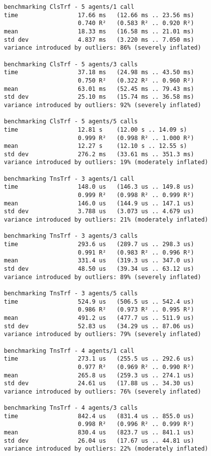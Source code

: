 \begin{verbatim}
benchmarking ClsTrf - 5 agents/1 call
time                 17.66 ms   (12.66 ms .. 23.56 ms)
                     0.740 R²   (0.583 R² .. 0.920 R²)
mean                 18.33 ms   (16.58 ms .. 21.01 ms)
std dev              4.837 ms   (3.220 ms .. 7.050 ms)
variance introduced by outliers: 86% (severely inflated)

benchmarking ClsTrf - 5 agents/3 calls
time                 37.18 ms   (24.98 ms .. 43.50 ms)
                     0.750 R²   (0.322 R² .. 0.960 R²)
mean                 63.01 ms   (52.45 ms .. 79.43 ms)
std dev              25.10 ms   (15.74 ms .. 36.58 ms)
variance introduced by outliers: 92% (severely inflated)

benchmarking ClsTrf - 5 agents/5 calls
time                 12.81 s    (12.00 s .. 14.09 s)
                     0.999 R²   (0.998 R² .. 1.000 R²)
mean                 12.27 s    (12.10 s .. 12.55 s)
std dev              276.2 ms   (33.61 ms .. 351.3 ms)
variance introduced by outliers: 19% (moderately inflated)

benchmarking TnsTrf - 3 agents/1 call
time                 148.0 us   (146.3 us .. 149.8 us)
                     0.999 R²   (0.998 R² .. 0.999 R²)
mean                 146.0 us   (144.9 us .. 147.1 us)
std dev              3.788 us   (3.073 us .. 4.679 us)
variance introduced by outliers: 21% (moderately inflated)

benchmarking TnsTrf - 3 agents/3 calls
time                 293.6 us   (289.7 us .. 298.3 us)
                     0.991 R²   (0.983 R² .. 0.996 R²)
mean                 331.4 us   (319.3 us .. 347.0 us)
std dev              48.50 us   (39.34 us .. 63.12 us)
variance introduced by outliers: 89% (severely inflated)

benchmarking TnsTrf - 3 agents/5 calls
time                 524.9 us   (506.5 us .. 542.4 us)
                     0.986 R²   (0.973 R² .. 0.995 R²)
mean                 491.2 us   (477.7 us .. 511.9 us)
std dev              52.83 us   (34.29 us .. 87.06 us)
variance introduced by outliers: 79% (severely inflated)

benchmarking TnsTrf - 4 agents/1 call
time                 273.1 us   (255.5 us .. 292.6 us)
                     0.977 R²   (0.969 R² .. 0.990 R²)
mean                 265.8 us   (259.3 us .. 274.1 us)
std dev              24.61 us   (17.88 us .. 34.30 us)
variance introduced by outliers: 76% (severely inflated)

benchmarking TnsTrf - 4 agents/3 calls
time                 842.4 us   (831.4 us .. 855.0 us)
                     0.998 R²   (0.996 R² .. 0.999 R²)
mean                 830.4 us   (823.7 us .. 841.1 us)
std dev              26.04 us   (17.67 us .. 44.81 us)
variance introduced by outliers: 22% (moderately inflated)


\end{verbatim}
